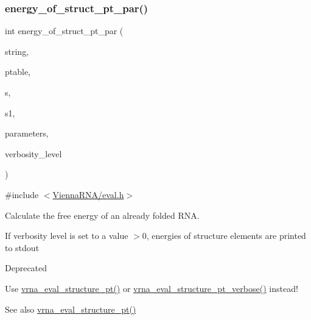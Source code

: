 \subsubsection{\texorpdfstring{energy\+\_\+of\+\_\+struct\+\_\+pt\+\_\+par()}{energy\_of\_struct\_pt\_par()}}
{\footnotesize\ttfamily int energy\+\_\+of\+\_\+struct\+\_\+pt\+\_\+par (\begin{DoxyParamCaption}\item[{const char $\ast$}]{string,  }\item[{short $\ast$}]{ptable,  }\item[{short $\ast$}]{s,  }\item[{short $\ast$}]{s1,  }\item[{\mbox{\hyperlink{group__energy__parameters_ga8a69ca7d787e4fd6079914f5343a1f35}{vrna\+\_\+param\+\_\+t}} $\ast$}]{parameters,  }\item[{int}]{verbosity\+\_\+level }\end{DoxyParamCaption})}



{\ttfamily \#include $<$\mbox{\hyperlink{eval_8h}{Vienna\+R\+N\+A/eval.\+h}}$>$}



Calculate the free energy of an already folded R\+NA. 

If verbosity level is set to a value $>$0, energies of structure elements are printed to stdout

\begin{DoxyRefDesc}{Deprecated}
\item[\mbox{\hyperlink{deprecated__deprecated000057}{Deprecated}}]Use \mbox{\hyperlink{group__eval_gadbd09372ddfd7a450bbd590c96a6bfe4}{vrna\+\_\+eval\+\_\+structure\+\_\+pt()}} or \mbox{\hyperlink{group__eval_ga8a517cfeeae8c376ae7b1e0c401d38b4}{vrna\+\_\+eval\+\_\+structure\+\_\+pt\+\_\+verbose()}} instead!\end{DoxyRefDesc}


\begin{DoxySeeAlso}{See also}
\mbox{\hyperlink{group__eval_gadbd09372ddfd7a450bbd590c96a6bfe4}{vrna\+\_\+eval\+\_\+structure\+\_\+pt()}}
\end{DoxySeeAlso}


